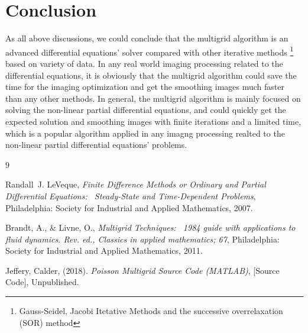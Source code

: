 \documentclass [a4paper, 12pt]{article}
\begin{document}
\section {Conclusion}
As all above discussions, we could conclude that the multigrid algorithm is an advanced differential equations' solver compared with other iterative methods \footnote {Gauss-Seidel, Jacobi Itetative Methods and the successive overrelaxation (SOR) method} based on variety of data. In any real world imaging processing related to the differential equations, it is obviously that the multigrid algorithm could save the time for the imaging optimization and get the smoothing images much faster than any other methods. 
In general, the multigrid algorithm is mainly focused on solving the non-linear partial differential equations, and could quickly get the expected solution and smoothing images with finite iterations and a limited time, which is a popular algorithm applied in any imagng processing realted to the non-linear partial differential equations' problems.

\begin {thebibliography} {9}

          Randall~J. LeVeque, \emph {Finite Difference Methods or Ordinary and Partial Differential Equations: \
Steady-State and Time-Dependent Problems}, Philadelphia: Society for Industrial and Applied Mathematics, 2007.

          Brandt, A., \& Livne, O., \emph {Multigrid Techniques: \
1984 guide with applications to fluid dynamics. Rev. ed., Classics in applied mathematics; 67}, Philadelphia: Society for Industrial and 
Applied Mathematics, 2011.

          Jeffery, Calder, (2018). \emph {Poisson Multigrid Source Code (MATLAB)}, [Source Code], Unpublished.
   
\end {thebibliography}
 
\end{document}
